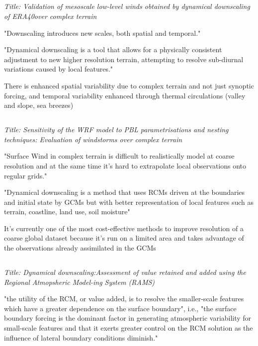 \documentclass[12pt,a4paper]{article}
\begin{document}
\subsection{\cite{Zagar2006}}

\textit{Title: Validation of mesoscale low-level winds obtained by dynamical downscaling of ERA40over complex terrain}
 
"Downscaling introduces new scales, both spatial and temporal."

"Dynamical downscaling is a tool that allows for a physically consistent adjustment to new higher resolution terrain, attempting to resolve sub-diurnal variations caused by local features."

There is enhanced spatial variability due to complex terrain and not just synoptic forcing, and temporal variability enhanced through thermal circulations (valley and slope, sea breezes) 


\subsection{\cite{Gomez-Navarro2015}}

\textit{Title:  Sensitivity of the WRF model to PBL parametrisations and nesting techniques: Evaluation of windstorms over complex terrain}

"Surface Wind in complex terrain is difficult to realistically model at coarse resolution and at the same time it's hard to extrapolate local observations onto regular grids."

"Dynamical downscaling is a method that uses RCMs driven at the boundaries and initial state by GCMs but with better representation of local features such as terrain, coastline, land use, soil moisture"

It's currently one of the most cost-effective methods to improve resolution of a coarse global dataset because it's run on a limited area and takes advantage of the observations already assimilated in the GCMs

\subsection{\cite{Castro2005}}

\textit{Title: Dynamical downscaling:Assessment of value retained and added using the Regional Atmopsheric Model-ing System (RAMS)}

"the utility of the RCM, or value added, is to resolve the smaller-scale features which have a greater dependence on the surface boundary", i.e., "the surface boundary forcing is the dominant factor in generating atmospheric variability for small-scale features and that it exerts greater control on the RCM solution as the influence of lateral boundary conditions diminish."
\end{document}
